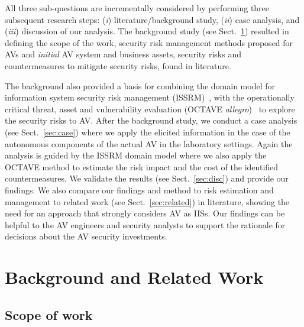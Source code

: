 \documentclass[runningheads]{llncs}
\begin{document}
All three sub-questions are incrementally considered by performing three subsequent research steps: (\textit{i}) literature/background study, (\textit{ii}) case analysis, and (\textit{iii}) discussion of our analysis. The background study (see Sect.~\ref{sec:appr}) resulted in defining the scope of the work, security risk management methods proposed for AVs and \textit{initial} AV system and business assets, security risks and countermeasures to mitigate security risks, found in literature. 

The background also provided a basis for combining the domain model for information system security risk management (ISSRM)~\cite{DuboisEtAl2010}, with the operationally critical threat, asset and vulnerability evaluation (OCTAVE \textit{allegro})~\cite{CaralliEtAl2007} to explore the security risks to AV. After the background study, we conduct a case analysis (see Sect.~\ref{sec:case}) where we apply the elicited information in the case of the autonomous components of the actual AV in the laboratory settings. Again the analysis is guided by the ISSRM domain model where we also apply the OCTAVE method to estimate the risk impact and the cost of the identified countermeasures. We validate the results (see Sect.~\ref{sec:disc}) and provide our findings. We also compare our findings and method to risk estimation and management to related work (see Sect.~\ref{sec:related}) in literature, showing the need for an approach that strongly considers AV as IISs. Our findings can be helpful to the AV engineers and security analysts to support the rationale for decisions about the AV security investments.


\section{Background and Related Work}
\label{sec:appr}
\subsection{Scope of work}
\end{document}
